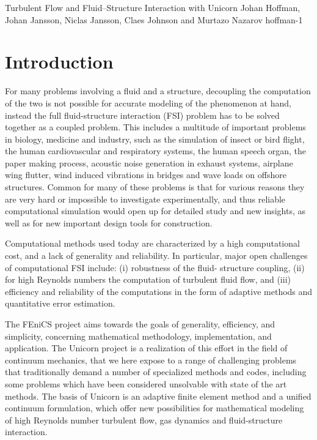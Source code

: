               {Turbulent Flow and Fluid--Structure Interaction with Unicorn}
              {Johan Hoffman, Johan Jansson, Niclas Jansson, Claes Johnson and Murtazo Nazarov}
              {hoffman-1}

\section{Introduction}

For many problems involving a fluid and a structure, decoupling the
computation of the two is not possible for accurate modeling of the
phenomenon at hand, instead the full fluid-structure interaction (FSI)
problem has to be solved together as a coupled problem. This includes
a multitude of important problems in biology, medicine and industry,
such as the simulation of insect or bird flight, the human
cardiovascular and respiratory systems, the human speech organ, the
paper making process, acoustic noise generation in exhaust systems,
airplane wing flutter, wind induced vibrations in bridges and wave
loads on offshore structures. Common for many of these problems is
that for various reasons they are very hard or impossible to
investigate experimentally, and thus reliable computational simulation
would open up for detailed study and new insights, as well as for new
important design tools for construction.

Computational methods used today are characterized by a high
computational cost, and a lack of generality and reliability. In
particular, major open challenges of computational FSI include: (i)
robustness of the fluid- structure coupling, (ii) for high Reynolds
numbers the computation of turbulent fluid flow, and (iii) efficiency
and reliability of the computations in the form of adaptive methods
and quantitative error estimation.

The FEniCS project aims towards the goals of generality, efficiency,
and simplicity, concerning mathematical methodology, implementation,
and application.  The Unicorn project is a realization of this effort
in the field of continuum mechanics, that we here expose to a range of
challenging problems that traditionally demand a number of specialized
methods and codes, including some problems which have been considered
unsolvable with state of the art methods.  The basis of Unicorn is an
adaptive finite element method and a unified continuum formulation,
which offer new possibilities for mathematical modeling of high
Reynolds number turbulent flow, gas dynamics and fluid-structure
interaction.

